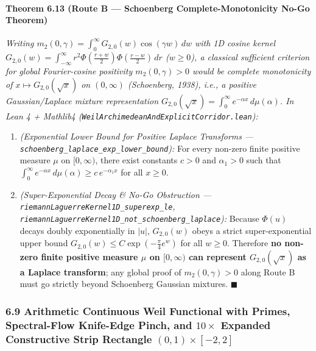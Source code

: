 \documentclass[
  11pt,
]{article}
\providecommand{\tightlist}{%
  \setlength{\itemsep}{0pt}\setlength{\parskip}{0pt}}
\begin{document}
\paragraph{Theorem 6.13 (Route B --- Schoenberg Complete-Monotonicity
No-Go
Theorem)}\label{theorem-6.13-route-b-schoenberg-complete-monotonicity-no-go-theorem}

\emph{Writing
\(m_2(0, \gamma) = \int_0^\infty G_{2,0}(w)\cos(\gamma w)\,dw\) with 1D
cosine kernel
\(G_{2,0}(w) = \int_{-\infty}^\infty r^2 \Phi(\frac{r+w}{2})\Phi(\frac{r-w}{2})\,dr\)
(\(w \ge 0\)), a classical sufficient criterion for global
Fourier-cosine positivity \(m_2(0, \gamma) > 0\) would be complete
monotonicity of \(x \mapsto G_{2,0}(\sqrt{x})\) on \((0, \infty)\)
(Schoenberg, 1938), i.e., a positive Gaussian/Laplace mixture
representation
\(G_{2,0}(\sqrt{x}) = \int_0^\infty e^{-\alpha x}\,d\mu(\alpha)\). In
Lean 4 + Mathlib4 (\texttt{WeilArchimedeanAndExplicitCorridor.lean}):}

\begin{enumerate}
\def\labelenumi{\arabic{enumi}.}
\tightlist
\item
  \emph{(Exponential Lower Bound for Positive Laplace Transforms ---
  \texttt{schoenberg\_laplace\_exp\_lower\_bound}):} For every non-zero
  finite positive measure \(\mu\) on \([0, \infty)\), there exist
  constants \(c > 0\) and \(\alpha_1 > 0\) such that
  \(\int_0^\infty e^{-\alpha x}\,d\mu(\alpha) \ge c\,e^{-\alpha_1 x}\)
  for all \(x \ge 0\).
\item
  \emph{(Super-Exponential Decay \& No-Go Obstruction ---
  \texttt{riemannLaguerreKernel1D\_superexp\_le},
  \texttt{riemannLaguerreKernel1D\_not\_schoenberg\_laplace}):} Because
  \(\Phi(u)\) decays doubly exponentially in \(|u|\), \(G_{2,0}(w)\)
  obeys a strict super-exponential upper bound
  \(G_{2,0}(w) \le C \exp(-\frac{\pi}{4} e^w)\) for all \(w \ge 0\).
  Therefore \textbf{no non-zero finite positive measure \(\mu\) on
  \([0, \infty)\) can represent \(G_{2,0}(\sqrt{x})\) as a Laplace
  transform}; any global proof of \(m_2(0, \gamma) > 0\) along Route B
  must go strictly beyond Schoenberg Gaussian mixtures. \(\blacksquare\)
\end{enumerate}

\subsubsection{\texorpdfstring{6.9 Arithmetic Continuous Weil Functional
with Primes, Spectral-Flow Knife-Edge Pinch, and \(10\times\) Expanded
Constructive Strip Rectangle
\((0, 1) \times [-2, 2]\)}{6.9 Arithmetic Continuous Weil Functional with Primes, Spectral-Flow Knife-Edge Pinch, and 10\textbackslash times Expanded Constructive Strip Rectangle (0, 1) \textbackslash times {[}-2, 2{]}}}\label{arithmetic-continuous-weil-functional-with-primes-spectral-flow-knife-edge-pinch-and-10times-expanded-constructive-strip-rectangle-0-1-times--2-2}
\end{document}
